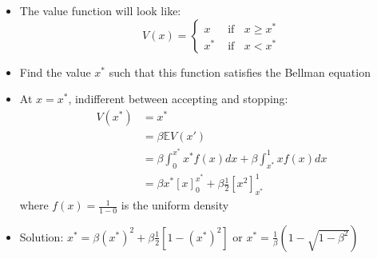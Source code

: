 \documentclass[11pt, aspectratio=169]{beamer}
\begin{document}
\begin{frame}{}

\begin{itemize}
\item The value function will look like:
\begin{equation*}
	V(x) = \begin{cases} x & \text{ if } \;\; x \geq x^* \\
		x^* & \text{ if } \;\; x < x^* 
		\end{cases}
\end{equation*}

\item Find the value $x^*$ such that this function satisfies the Bellman equation

\item At $x = x^*$, indifferent between accepting and stopping:
\begin{align*}
	V(x^*) &= x^* \\
	&= \beta \mathbb{E} V(x') \\
	&= \beta \int_0^{x^*} x^* f(x) dx + \beta \int_{x^*}^1 x f(x) dx \\
	&= \beta x^*  [x]_0^{x^*} + \beta \frac{1}{2} [x^2]_{x^*}^1
\end{align*}
where $f(x) = \frac{1}{1 - 0}$ is the uniform density

\item Solution: $x^* = \beta (x^*)^2 + \beta \frac{1}{2} [1 - (x^*)^2]$ or $x^* = \frac{1}{\beta} (1 - \sqrt{1 - \beta^2})$

\end{itemize}
\end{frame}
\end{document}
